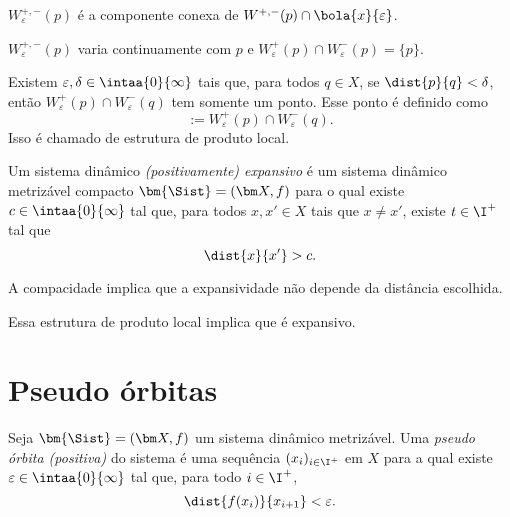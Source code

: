 $W^{+,-}_\varepsilon(p)$ é a componente conexa de $W^{+,-}(p) \cap \bola{x}{\varepsilon}$.

$W^{+,-}_\varepsilon(p)$ varia continuamente com $p$ e $W^+_\varepsilon(p) \cap W^-_\varepsilon(p) = \{p\}$.

Existem $\varepsilon,\delta \in \intaa{0}{\infty}$ tais que, para todos $q \in X$, se $\dist{p}{q} < \delta$, então $W^+_\varepsilon(p) \cap W^-_\varepsilon(q)$ tem somente um ponto. Esse ponto é definido como
	\begin{equation*}
	[p,q] := W^+_\varepsilon(p) \cap W^-_\varepsilon(q).
	\end{equation*}
Isso é chamado de estrutura de produto local.

\begin{definition}
Um sistema dinâmico \emph{(positivamente) expansivo} é um sistema dinâmico metrizável compacto $\bm{\Sist}=(\bm X,f)$ para o qual existe $c \in \intaa{0}{\infty}$ tal que, para todos $x,x' \in X$ tais que $x \neq x'$, existe $t \in \I^+$ tal que
	\begin{equation*}
	\dist{x}{x'} > c.
	\end{equation*}
\end{definition}

A compacidade implica que a expansividade não depende da distância escolhida.

Essa estrutura de produto local implica que é expansivo.


\section{Pseudo órbitas}

\begin{definition}
Seja $\bm{\Sist}=(\bm X,f)$ um sistema dinâmico metrizável. Uma \emph{pseudo órbita (positiva)} do sistema é uma sequência $(x_i)_{i \in \I^+}$ em $X$ para a qual existe $\varepsilon \in \intaa{0}{\infty}$ tal que, para todo $i \in \I^+$,
	\begin{equation*}
	\dist{f(x_i)}{x_{i+1}} < \varepsilon.
	\end{equation*}
\end{definition}

